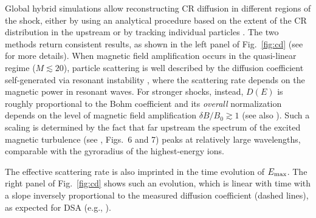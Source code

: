 \documentclass[varenna]{cimento}
\newcommand{\Em}{E_{\rm max}}
\begin{document}
Global hybrid simulations allow reconstructing CR diffusion in different regions of the shock, either by using an analytical procedure based on the extent of the CR distribution in the upstream or by tracking individual particles \cite{caprioli+14c}.
The two methods return consistent results, as shown in the left panel of Fig.~\ref{fig:cd} (see \cite{caprioli+14c} for more details).
When magnetic field amplification occurs in the quasi-linear regime ($M\lesssim20$), particle scattering is well described by the diffusion coefficient self-generated via resonant instability \cite{bell78a,amato+06}, where the scattering rate depends on the magnetic power in resonant waves.
For stronger shocks, instead, $D(E)$ is roughly proportional to the Bohm coefficient and its \emph{overall} normalization depends on the level of magnetic field amplification $\delta B/B_0\gtrsim 1$ (see also \cite{reville+13}).
Such a scaling is determined by the fact that far upstream the spectrum of the excited magnetic turbulence (see \cite{caprioli+14b}, Figs.\ 6 and 7) peaks at relatively large wavelengths, comparable with the gyroradius of the highest-energy ions.  

The effective scattering rate is also imprinted in the time evolution of $\Em$. 
The right panel of Fig.~\ref{fig:cd} shows such an evolution, which is linear with time with a slope inversely proportional to the measured diffusion coefficient (dashed lines), as expected for DSA (e.g., \cite{drury83,lagage+83a,blasi+07}).










\end{document}
